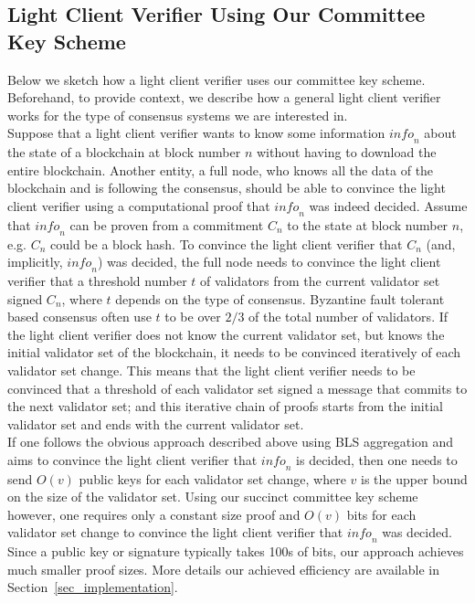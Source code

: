 \subsection{Light Client Verifier Using Our Committee Key Scheme}\label{ssec:lcsketch}

\noindent Below we sketch how a light client verifier uses our committee key scheme. Beforehand, to provide context, 
we describe how a general light client verifier works for the type of consensus systems we are interested in. \\

\noindent Suppose that a light client verifier wants to know some information $\mathit{info}_n$ 
about the state of a blockchain at block number $n$ without having to download the entire blockchain. 
Another entity, a full node, who knows all the data of the blockchain and is following the consensus, should be able to convince 
the light client verifier using a computational proof that $\mathit{info}_n$ was indeed decided. Assume that $\mathit{info}_n$ 
can be proven from a commitment $C_n$ to the state at block number $n$, e.g. $C_n$ could be a block hash. 
To convince the light client verifier that $C_n$ (and, implicitly, $\mathit{info}_n$) was decided, 
the full node needs to convince the light client verifier that a threshold number $t$ of 
validators from the current validator set signed $C_n$, where $t$ depends on the type of consensus. 
Byzantine fault tolerant based consensus often use $t$ to be over $2/3$ of the total number of validators. 
If the light client verifier does not know the current validator set, but knows the initial validator set of the blockchain, 
it needs to be convinced iteratively of each validator set change. This means that the light client verifier needs to be convinced 
that a threshold of each validator set signed a message that commits to the next validator set; and this iterative chain of proofs starts 
from the initial validator set and ends with the current validator set. \\

\noindent If one follows the obvious approach described above using BLS aggregation and aims to convince the light client verifier 
that $\mathit{info}_n$ is decided, then one needs to send $O(v)$ public keys for each validator set change, where $v$ is the upper bound 
on the size of the validator set.
Using our succinct committee key scheme however, one requires only a constant size proof and $O(v)$ bits for each validator set change to convince 
the light client verifier that $\mathit{info}_n$ was decided. Since a public key or signature typically takes 100s of bits, our approach 
achieves much smaller proof sizes. More details our achieved efficiency are available in Section~\ref{sec_implementation}.

